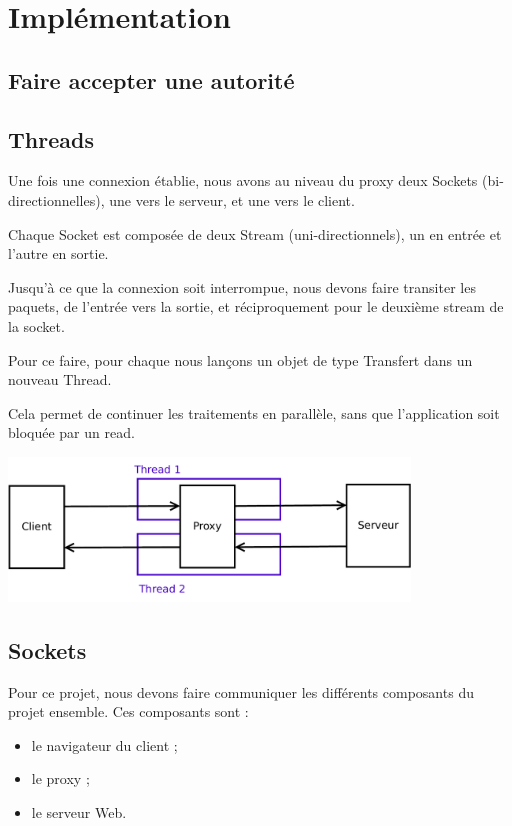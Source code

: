 \documentclass[a4paper,11pt,french]{report}
\begin{document}
\section{Implémentation}
\subsection{Faire accepter une autorité}


\subsection{Threads}

Une fois une connexion établie, nous avons au niveau du proxy deux Sockets (bi-directionnelles), une vers le serveur, et une vers le client.

Chaque Socket est composée de deux Stream (uni-directionnels), un en entrée et l'autre en sortie.

Jusqu'à ce que la connexion soit interrompue, nous devons faire transiter les paquets, de l'entrée vers la sortie, et réciproquement pour le deuxième stream de la socket.

Pour ce faire, pour chaque nous lançons un objet de type Transfert dans un nouveau Thread.

Cela permet de continuer les traitements en parallèle, sans que l'application soit bloquée par un read.

\includegraphics[width=0.8\textwidth]{images/thread.pdf}

\subsection{Sockets}
Pour ce projet, nous devons faire communiquer les différents composants du projet ensemble. Ces composants sont :
\begin{itemize}
\item le navigateur du client ;
\item le proxy ;
\item le serveur Web.
\end{itemize}
\end{document}

